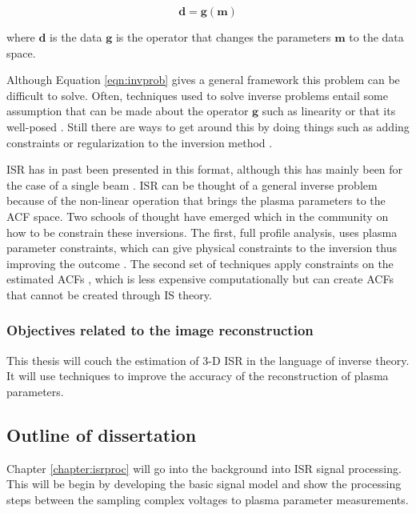 \begin{equation}
\label{eqn:invprob}
\mathbf{d}=\mathbf{g}(\mathbf{m})
\end{equation}

\noindent where $\mathbf{d}$ is the data $\mathbf{g}$ is the operator that changes the parameters $\mathbf{m}$ to the data space. 

Although Equation \ref{eqn:invprob} gives a general framework this problem can be difficult to solve. Often, techniques used to solve inverse problems entail some assumption that can be made about the operator $\mathbf{g}$ such as linearity or that its well-posed \cite{0266-5611-4-4-010}. Still there are ways to get around this by doing things such as adding constraints or regularization to the inversion method \cite{Vogel:2002:CMI:581830}.

ISR has in past been presented in this format, although this has mainly been for the case of a single beam \cite{Vierinen:2012ve}. ISR can be thought of a general inverse problem because of the non-linear operation that brings the plasma parameters to the ACF space. Two schools of thought have emerged which in the community on how to be constrain these inversions. The first, full profile analysis, uses plasma parameter constraints, which can give physical constraints to the inversion thus improving the outcome \cite{hysell2008,RDS:RDS3308}. The second set of techniques apply constraints on the estimated ACFs \cite{Virtanen:20082vx,nikoukar2008}, which is less expensive computationally but can create ACFs that cannot be created through IS theory.

\subsubsection{Objectives related to the image reconstruction}
This thesis will couch the estimation of 3-D ISR in the language of inverse theory. It will use techniques to improve the accuracy of the reconstruction of plasma parameters.

\subsection{Outline of dissertation}

Chapter \ref{chapter:isrproc} will go into the background into ISR signal processing. This will be begin by developing the basic signal model and show the processing steps between the sampling complex voltages to plasma parameter measurements.

